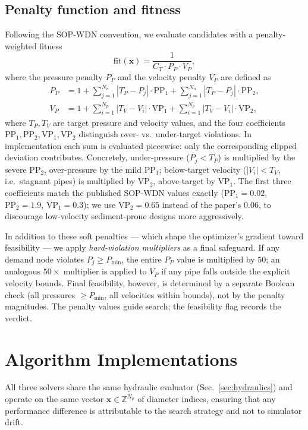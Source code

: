 \documentclass[conference]{IEEEtran}
\begin{document}
\subsection{Penalty function and fitness}
Following the SOP-WDN convention, we evaluate candidates with a penalty-weighted fitness
\begin{equation}
\mathrm{fit}(\mathbf{x}) = \frac{1}{C_T\cdot P_P \cdot V_P},
\label{eq:fitness}
\end{equation}
where the pressure penalty $P_P$ and the velocity penalty $V_P$ are defined as
\begin{align}
P_P &= 1 + \sum_{j=1}^{N_n} |T_P - P_j|\cdot \mathrm{PP}_1 + \sum_{j=1}^{N_n} |T_P - P_j|\cdot \mathrm{PP}_2,\label{eq:pp}\\
V_P &= 1 + \sum_{i=1}^{N_p} |T_V - V_i|\cdot \mathrm{VP}_1 + \sum_{i=1}^{N_p} |T_V - V_i|\cdot \mathrm{VP}_2,\label{eq:vp}
\end{align}
where $T_P, T_V$ are target pressure and velocity values, and the four coefficients $\mathrm{PP}_1, \mathrm{PP}_2, \mathrm{VP}_1, \mathrm{VP}_2$ distinguish over- vs.\ under-target violations. In implementation each sum is evaluated piecewise: only the corresponding clipped deviation contributes. Concretely, under-pressure ($P_j < T_P$) is multiplied by the severe $\mathrm{PP}_2$, over-pressure by the mild $\mathrm{PP}_1$; below-target velocity ($|V_i| < T_V$, i.e.\ stagnant pipes) is multiplied by $\mathrm{VP}_2$, above-target by $\mathrm{VP}_1$. The first three coefficients match the published SOP-WDN values exactly ($\mathrm{PP}_1{=}0.02$, $\mathrm{PP}_2{=}1.9$, $\mathrm{VP}_1{=}0.3$); we use $\mathrm{VP}_2{=}0.65$ instead of the paper's $0.06$, to discourage low-velocity sediment-prone designs more aggressively.

In addition to these soft penalties --- which shape the optimizer's gradient toward feasibility --- we apply \emph{hard-violation multipliers} as a final safeguard. If any demand node violates $P_j \geq P_{\min}$, the entire $P_P$ value is multiplied by $50$; an analogous $50\times$ multiplier is applied to $V_P$ if any pipe falls outside the explicit velocity bounds. Final feasibility, however, is determined by a separate Boolean check (all pressures $\geq P_{\min}$, all velocities within bounds), not by the penalty magnitudes. The penalty values guide search; the feasibility flag records the verdict.

\section{Algorithm Implementations}
\label{sec:algorithms}
All three solvers share the same hydraulic evaluator (Sec.~\ref{sec:hydraulics}) and operate on the same vector $\mathbf{x}\in\mathbb{Z}^{N_p}$ of diameter indices, ensuring that any performance difference is attributable to the search strategy and not to simulator drift.
\end{document}
